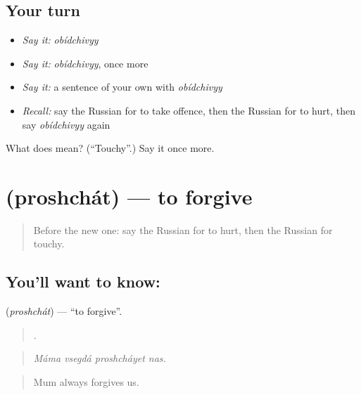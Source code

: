 \subsection*{Your turn}
\begin{itemize}
\raggedright
  \item \emph{Say it:} \emph{obídchivyy}
  \item \emph{Say it:} \emph{obídchivyy}, once more
  \item \emph{Say it:} a sentence of your own with \emph{obídchivyy}
  \item \emph{Recall:} say the Russian for to take offence, then the Russian for to hurt, then say \emph{obídchivyy} again
\end{itemize}

\begin{tcolorbox}[breakable,colback=teal!4,colframe=teal!35!black,title={Before you move on}]
What does  mean? (\textquotedblleft{}Touchy\textquotedblright{}.) Say it once more.
\end{tcolorbox}
\section[\texorpdfstring{\ru{прощать} (proshchát)}{прощать (proshchát)}]{ (proshchát) — to forgive}

\label{lesson:RU-C471-proshchat}



\begin{quote}
Before the new one: say the Russian for to hurt, then the Russian for touchy.
\end{quote}

\subsection*{You'll want to know: }
\textbf{} (\emph{proshchát}) — \textquotedblleft{}to forgive\textquotedblright{}.

\begin{quote}
   .
\end{quote}

\begin{quote}
\emph{Máma vsegdá proshcháyet nas.}
\end{quote}

\begin{quote}
Mum always forgives us.
\end{quote}

